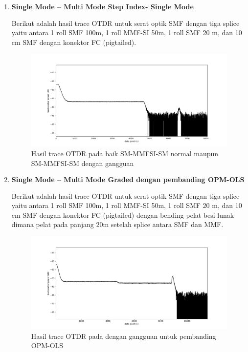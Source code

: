 \documentclass[12pt]{article}
\begin{document}
\begin{enumerate}
\newpage	
	
		\item \textbf{Single Mode – Multi Mode Step Index- Single Mode }
		
		Berikut adalah hasil trace OTDR untuk serat optik SMF dengan tiga splice yaitu antara 1 roll SMF 100m, 1 roll MMF-SI 50m, 1 roll SMF 20 m, dan 10 cm SMF dengan konektor FC (pigtailed).
		
		\begin{figure}[!h]
			\centering
			\captionsetup{justification=centering}
			\includegraphics[width=\linewidth]{images/Bab_4/Bab_4_3f1}
			\caption[Trace SM-MMFSI-SM ]{\small{Hasil trace OTDR pada baik SM-MMFSI-SM  normal maupun SM-MMFSI-SM  dengan gangguan}}
		\end{figure}
	
		\item \textbf{Single Mode – Multi Mode Graded dengan pembanding OPM-OLS}
		
		Berikut adalah hasil trace OTDR untuk serat optik SMF dengan tiga splice yaitu antara 1 roll SMF 100m, 1 roll MMF-SI 50m, 1 roll SMF 20 m, dan 10 cm SMF dengan konektor FC (pigtailed) dengan bending pelat besi lunak dimana pelat pada panjang 20m setelah splice  antara SMF dan MMF. 
		
		\begin{figure}[!h]
			\centering
			\captionsetup{justification=centering}
			\includegraphics[width=\linewidth]{images/Bab_4/Bab_4_3g1}
			\caption[Trace SM-MMFSI-SM ]{\small{Hasil trace OTDR pada dengan gangguan untuk pembanding OPM-OLS}}
		\end{figure}
	

\end{enumerate}
\end{document}
